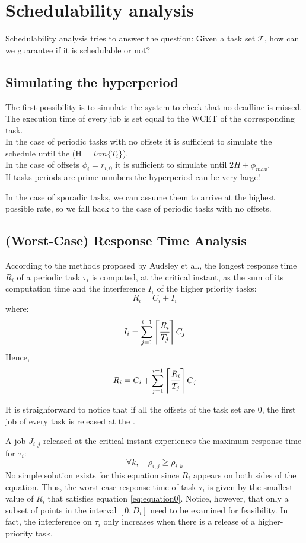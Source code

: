 \section{Schedulability analysis}
Schedulability analysis tries to answer the question: Given a task set $\mathcal{T}$, how can we guarantee if it is schedulable or not?
\subsection{Simulating the hyperperiod}
The first possibility is to simulate the system to check that no deadline is missed. The execution time of every job is set equal to the WCET of the corresponding task.\\

In the case of periodic tasks with no offsets it is sufficient to simulate the schedule until the  (H = $lcm\{T_i\}$).\\
In the case of offsets $\phi_i = r_{i,0}$ it is sufficient to simulate until $2H + \phi_{max}$.\\
If tasks periods are prime numbers the hyperperiod can be very large!

In the case of sporadic tasks, we can assume them to arrive at the highest possible rate, so we fall back to the case of periodic tasks with no offsets.

\subsection{(Worst-Case) Response Time Analysis}
According to the methods proposed by Audsley et al., the longest response time $R_i$ of a periodic task $\tau_i$ is computed, at the critical instant, as the sum of its computation time and the interference $I_i$ of the higher priority tasks:
\[R_i = C_i + I_i\]
where:
\[I_i = \sum_{j=1}^{i-1} \left\lceil \cfrac{R_i}{T_j} \right\rceil C_j\]
Hence,
\begin{equation}
    \label{eq:equation0}
    R_i = C_i + \sum_{j=1}^{i-1} \left\lceil \cfrac{R_i}{T_j} \right\rceil C_j
\end{equation}

It is straighforward to notice that if all the offsets of the task set are 0, the first job of every task is released at the .

A job $J_{i,j}$ released at the critical instant experiences the maximum response time for $\tau_i$:
\[\forall k,\quad \rho_{i,j}\ge\rho_{i,k}\]
No simple solution exists for this equation since $R_i$ appears on both sides of the equation. Thus, the worst-case response time of task $\tau_i$ is given by the smallest value of $R_i$ that satisfies equation \ref{eq:equation0}.
Notice, however, that only a subset of points in the interval $[0, D_i]$ need to be examined for feasibility. In fact, the interference on $\tau_i$ only increases when there is a release of a higher-priority task.

